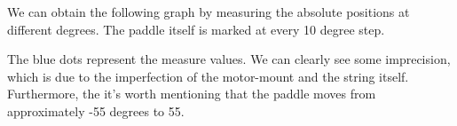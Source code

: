  We can obtain the following graph by measuring the absolute positions at different degrees. The paddle itself is marked at every 10 degree step.

  \begin{figure}[H]
    \centering
  \end{figure}
  
  The blue dots represent the measure values. We can clearly see some imprecision, which is due to the imperfection of the motor-mount and the string itself. Furthermore, the it's worth mentioning that the paddle moves from approximately -55 degrees to 55.

